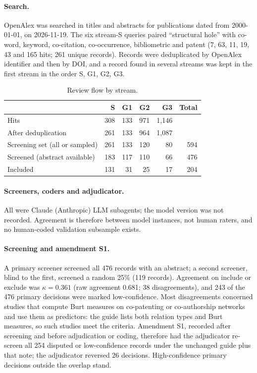 \paragraph{Search.} OpenAlex was searched in titles and abstracts for publications dated from 2000-01-01, on 2026-11-19. The six stream-S queries paired ``structural hole'' with co-word, keyword, co-citation, co-occurrence, bibliometric and patent (7, 63, 11, 19, 43 and 165 hits; 261 unique records). Records were deduplicated by OpenAlex identifier and then by DOI, and a record found in several streams was kept in the first stream in the order S, G1, G2, G3.

\begin{table}[htbp]
  \centering
  \caption{Review flow by stream.}
  \label{tab:app_review_flow}
  \small
  \begin{tabular}{lrrrrr}
    \toprule
    & S & G1 & G2 & G3 & Total \\
    \midrule
    Hits & 308 & 133 & 971 & 1,146 & \\
    After deduplication & 261 & 133 & 964 & 1,087 & \\
    Screening set (all or sampled) & 261 & 133 & 120 & 80 & 594 \\
    Screened (abstract available) & 183 & 117 & 110 & 66 & 476 \\
    Included & 131 & 31 & 25 & 17 & 204 \\
    \bottomrule
  \end{tabular}
\end{table}

\paragraph{Screeners, coders and adjudicator.} All were Claude (Anthropic) LLM subagents; the model version was not recorded. Agreement is therefore between model instances, not human raters, and no human-coded validation subsample exists.

\paragraph{Screening and amendment S1.} A primary screener screened all 476 records with an abstract; a second screener, blind to the first, screened a random 25\% (119 records). Agreement on include or exclude was $\kappa = 0.361$ (raw agreement 0.681; 38 disagreements), and 243 of the 476 primary decisions were marked low-confidence. Most disagreements concerned studies that compute Burt measures on co-patenting or co-authorship networks and use them as predictors: the guide lists both relation types and Burt measures, so such studies meet the criteria. Amendment S1, recorded after screening and before adjudication or coding, therefore had the adjudicator re-screen all 254 disputed or low-confidence records under the unchanged guide plus that note; the adjudicator reversed 26 decisions. High-confidence primary decisions outside the overlap stand.

